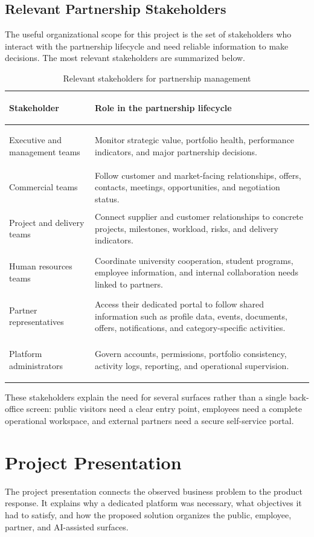 \subsection{Relevant Partnership Stakeholders}
The useful organizational scope for this project is the set of stakeholders who interact with the partnership lifecycle and need reliable information to make decisions. The most relevant stakeholders are summarized below.
\begin{table}[H]
  \centering
  \caption{Relevant stakeholders for partnership management}
  \begin{tabularx}{\textwidth}{>{\bfseries\raggedright\arraybackslash}p{3.6cm}X}
    \toprule
    Stakeholder & Role in the partnership lifecycle \\
    \midrule
    Executive and management teams & Monitor strategic value, portfolio health, performance indicators, and major partnership decisions. \\
    Commercial teams & Follow customer and market-facing relationships, offers, contacts, meetings, opportunities, and negotiation status. \\
    Project and delivery teams & Connect supplier and customer relationships to concrete projects, milestones, workload, risks, and delivery indicators. \\
    Human resources teams & Coordinate university cooperation, student programs, employee information, and internal collaboration needs linked to partners. \\
    Partner representatives & Access their dedicated portal to follow shared information such as profile data, events, documents, offers, notifications, and category-specific activities. \\
    Platform administrators & Govern accounts, permissions, portfolio consistency, activity logs, reporting, and operational supervision. \\
    \bottomrule
  \end{tabularx}
\end{table}
These stakeholders explain the need for several surfaces rather than a single back-office screen: public visitors need a clear entry point, employees need a complete operational workspace, and external partners need a secure self-service portal.
\section{Project Presentation}
The project presentation connects the observed business problem to the product response. It explains why a dedicated platform was necessary, what objectives it had to satisfy, and how the proposed solution organizes the public, employee, partner, and AI-assisted surfaces.
